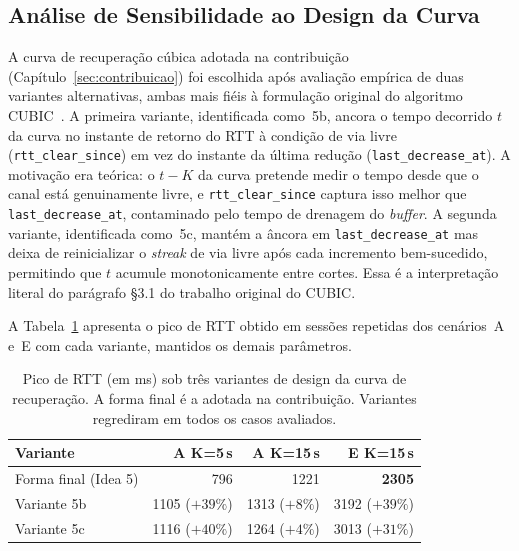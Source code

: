 \documentclass[conference]{IEEEtran}
\begin{document}
\subsection{Análise de Sensibilidade ao Design da Curva}\label{sec:sensibilidade}

A curva de recuperação cúbica adotada na contribuição
(Capítulo~\ref{sec:contribuicao}) foi escolhida após avaliação
empírica de duas variantes alternativas, ambas mais fiéis à
formulação original do algoritmo CUBIC~\cite{cubic}. A primeira
variante, identificada como~5b, ancora o tempo decorrido $t$ da
curva no instante de retorno do RTT à condição de via livre
(\texttt{rtt\_clear\_since}) em vez do instante da última redução
(\texttt{last\_decrease\_at}). A motivação era teórica: o $t-K$
da curva pretende medir o tempo desde que o canal está
genuinamente livre, e \texttt{rtt\_clear\_since} captura isso
melhor que \texttt{last\_decrease\_at}, contaminado pelo
tempo de drenagem do \emph{buffer}. A segunda variante,
identificada como~5c, mantém a âncora em
\texttt{last\_decrease\_at} mas deixa de reinicializar o
\emph{streak} de via livre após cada incremento bem-sucedido,
permitindo que $t$ acumule monotonicamente entre cortes. Essa
é a interpretação literal do parágrafo §3.1 do trabalho
original do CUBIC.

A Tabela~\ref{tab:sensitivity} apresenta o pico de RTT obtido
em sessões repetidas dos cenários~A e~E com cada variante,
mantidos os demais parâmetros.

\begin{table}[!t]
  \caption{Pico de RTT (em ms) sob três variantes de design da
  curva de recuperação. A forma final é a adotada na
  contribuição. Variantes regrediram em todos os casos
  avaliados.}
  \label{tab:sensitivity}
  \centering
  \begin{tabular}{lrrr}
    \toprule
    \textbf{Variante} & \textbf{A K=5\,s} & \textbf{A K=15\,s} & \textbf{E K=15\,s} \\
    \midrule
    Forma final (Idea 5)  & 796   & 1221  & \textbf{2305} \\
    Variante 5b           & 1105 \scriptsize($+39\%$) & 1313 \scriptsize($+8\%$)  & 3192 \scriptsize($+39\%$) \\
    Variante 5c           & 1116 \scriptsize($+40\%$) & 1264 \scriptsize($+4\%$)  & 3013 \scriptsize($+31\%$) \\
    \bottomrule
  \end{tabular}
\end{table}
\end{document}
